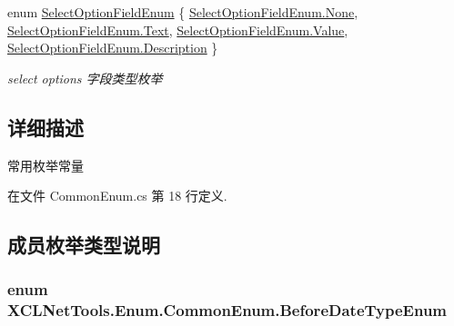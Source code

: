 \begin{DoxyCompactItemize}
\item 
enum \hyperlink{class_x_c_l_net_tools_1_1_enum_1_1_common_enum_afe1323cff3b78e93907bf636697b2b59}{Select\+Option\+Field\+Enum} \{ \hyperlink{class_x_c_l_net_tools_1_1_enum_1_1_common_enum_afe1323cff3b78e93907bf636697b2b59a6adf97f83acf6453d4a6a4b1070f3754}{Select\+Option\+Field\+Enum.\+None}, 
\hyperlink{class_x_c_l_net_tools_1_1_enum_1_1_common_enum_afe1323cff3b78e93907bf636697b2b59a9dffbf69ffba8bc38bc4e01abf4b1675}{Select\+Option\+Field\+Enum.\+Text}, 
\hyperlink{class_x_c_l_net_tools_1_1_enum_1_1_common_enum_afe1323cff3b78e93907bf636697b2b59a689202409e48743b914713f96d93947c}{Select\+Option\+Field\+Enum.\+Value}, 
\hyperlink{class_x_c_l_net_tools_1_1_enum_1_1_common_enum_afe1323cff3b78e93907bf636697b2b59ab5a7adde1af5c87d7fd797b6245c2a39}{Select\+Option\+Field\+Enum.\+Description}
 \}\begin{DoxyCompactList}\small\item\em select options 字段类型枚举 \end{DoxyCompactList}
\end{DoxyCompactItemize}


\subsection{详细描述}
常用枚举常量 



在文件 Common\+Enum.\+cs 第 18 行定义.



\subsection{成员枚举类型说明}
\subsubsection[{\texorpdfstring{Before\+Date\+Type\+Enum}{BeforeDateTypeEnum}}]{\setlength{\rightskip}{0pt plus 5cm}enum {\bf X\+C\+L\+Net\+Tools.\+Enum.\+Common\+Enum.\+Before\+Date\+Type\+Enum}\hspace{0.3cm}{\ttfamily [strong]}}\hypertarget{class_x_c_l_net_tools_1_1_enum_1_1_common_enum_abac0e863746b7fb8e6364c17f61648ea}{}\label{class_x_c_l_net_tools_1_1_enum_1_1_common_enum_abac0e863746b7fb8e6364c17f61648ea}



